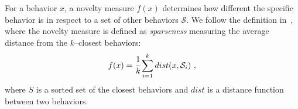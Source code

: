 \documentclass{sig-alternate}
\begin{document}

For a behavior $x$, a novelty measure $f(x)$ determines how different the specific behavior is in respect to a set of other behaviors $\mathcal{S}$. We follow the definition in~\cite{lehman2008exploiting,lehman2011abandoning}, where the novelty measure is defined as \emph{sparseness} measuring the average distance from the $k$--closest behaviors:
\begin{equation}
\label{sparsenessEquation}
f(x) = \cfrac{1}{k} \sum_{i=1}^{k} dist(x, \mathcal{S}_i)\ , 
\end{equation}
where $S$ is a sorted set of the closest behaviors and $dist$ is a distance function between two behaviors.




\end{document}
